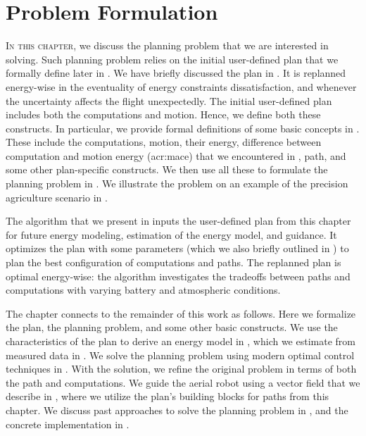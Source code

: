 
\chapter{Problem Formulation}
\label{cp:pb}

\lettrine{I}{n this chapter}, we discuss the planning problem that we are interested in solving. Such planning problem relies on the initial user-defined plan that we formally define later in . We have briefly discussed the plan in . It is replanned energy-wise in the eventuality of energy constraints dissatisfaction, and whenever the uncertainty affects the flight unexpectedly. The initial user-defined plan includes both the computations and motion. Hence, we define both these constructs. In particular, we provide formal definitions of some basic concepts in . These include the computations, motion, their energy, difference between computation and motion energy (\Gls{acr:mace}) that we encountered in , path, and some other plan-specific constructs. We then use all these to formulate the planning problem in . We illustrate the problem on an example of the precision agriculture scenario in .

The algorithm that we present in  inputs the user-defined plan from this chapter for future energy modeling, estimation of the energy model, and guidance. It optimizes the plan with some parameters (which we also briefly outlined in ) to plan the best configuration of computations and paths. The replanned plan is optimal energy-wise: the algorithm investigates the tradeoffs between paths and computations with varying battery and atmospheric conditions.

The chapter connects to the remainder of this work as follows. Here we formalize the plan, the planning problem, and some other basic constructs. We use the characteristics of the plan to derive an energy model in , which we estimate from measured data in . We solve the planning problem using modern optimal control techniques in . With the solution, we refine the original problem in terms of both the path and computations. We guide the aerial robot using a vector field that we describe in , where we utilize the plan's building blocks for paths from this chapter. We discuss past approaches to solve the planning problem in , and the concrete implementation in .


